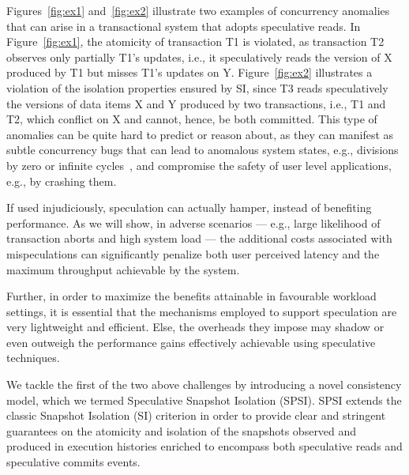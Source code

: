 Figures~\ref{fig:ex1} and~\ref{fig:ex2} illustrate two examples of concurrency anomalies that can arise in a transactional system that adopts speculative reads. In Figure~\ref{fig:ex1}, the atomicity of transaction T1 is violated, as transaction T2 observes only partially T1's updates, i.e., it speculatively reads the version of X produced by T1 but misses T1's updates on Y. Figure~\ref{fig:ex2} illustrates a violation of the isolation properties ensured by SI, since T3 reads speculatively the versions of data items X and Y  produced by two transactions, i.e., T1 and T2, which conflict on X and cannot, hence, be both committed. This type of anomalies can be quite hard to predict or reason about, as they can manifest as subtle concurrency bugs that can lead to anomalous system states, e.g., divisions by zero or infinite cycles~\cite{guerraoui2007opacity}, and compromise the safety of user level applications, e.g., by crashing them.

\vspace{4pt} If used injudiciously, speculation can actually hamper, instead of benefiting performance. As we will show, in adverse scenarios  --- e.g., large likelihood of transaction aborts and high system load --- the additional costs associated with mispeculations can significantly penalize both user perceived latency and the maximum throughput achievable by the system.

Further, in order to maximize the benefits attainable in favourable workload settings, it is essential that the mechanisms employed to support speculation are very lightweight and efficient. Else, the overheads they impose may shadow or even outweigh the performance gains effectively achievable using speculative techniques.


We tackle the first of the two above challenges by introducing a novel consistency model, which we termed Speculative Snapshot Isolation (SPSI). SPSI extends the classic Snapshot  Isolation (SI) criterion in order to provide clear and stringent guarantees on the atomicity and isolation of the snapshots observed and produced in execution histories enriched to encompass both speculative reads and speculative commits events.  %

